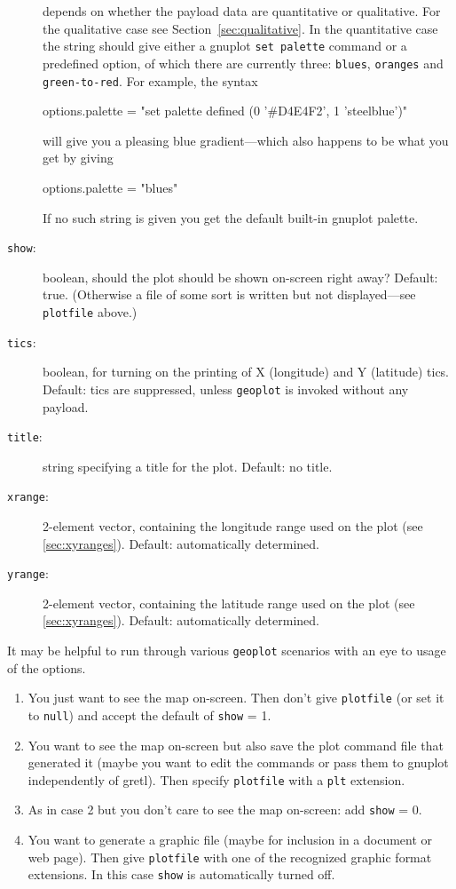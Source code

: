 \documentclass{article}
\begin{document}
\begin{description}
  depends on whether the payload data are quantitative or
  qualitative. For the qualitative case see
  Section~\ref{sec:qualitative}. In the quantitative case the string
  should give either a \textsf{gnuplot} \texttt{set palette} command
  or a predefined option, of which there are currently three:
  \texttt{blues}, \texttt{oranges} and \texttt{green-to-red}. For
  example, the syntax
  \begin{code}
    options.palette = "set palette defined (0 '#D4E4F2', 1 'steelblue')"
  \end{code}
  will give you a pleasing blue gradient---which also happens to be
  what you get by giving
  \begin{code}
    options.palette = "blues"
  \end{code}
  If no such string is given you get the default built-in
  \textsf{gnuplot} palette.
\item[\texttt{show}:] boolean, should the plot should be shown
  on-screen right away? Default: true. (Otherwise a file of some sort
  is written but not displayed---see \texttt{plotfile} above.)
\item[\texttt{tics}:] boolean, for turning on the printing of X
  (longitude) and Y (latitude) tics. Default: tics are suppressed,
  unless \texttt{geoplot} is invoked without any payload.
\item[\texttt{title}:] string specifying a title for the
  plot. Default: no title.
\item[\texttt{xrange}:] 2-element vector, containing the longitude
  range used on the plot (see \ref{sec:xyranges}). Default:
  automatically determined.
\item[\texttt{yrange}:] 2-element vector, containing the latitude
  range used on the plot (see \ref{sec:xyranges}). Default:
  automatically determined.
\end{description}

It may be helpful to run through various \texttt{geoplot} scenarios
with an eye to usage of the options.

\begin{enumerate}
\item You just want to see the map on-screen. Then don't give
  \texttt{plotfile} (or set it to \texttt{null}) and accept the
  default of \texttt{show} = 1.\label{just-see}
\item You want to see the map on-screen but also save the plot command
  file that generated it (maybe you want to edit the commands or pass
  them to \textsf{gnuplot} independently of gretl). Then specify
  \texttt{plotfile} with a \texttt{plt} extension.\label{see-and-save}
\item As in case 2 but you don't care to see the map on-screen: add
  \texttt{show} = 0.
\item You want to generate a graphic file (maybe for inclusion in a
  document or web page). Then give \texttt{plotfile} with one of the
  recognized graphic format extensions. In this case \texttt{show} is
  automatically turned off.
\end{enumerate}
\end{document}
